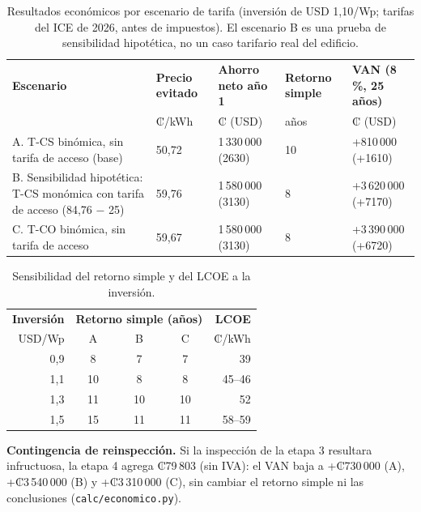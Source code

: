 \documentclass[12pt]{article}
\begin{document}
\begin{table}[H]
\centering\small
\caption{Resultados económicos por escenario de tarifa (inversión de USD 1,10/Wp; tarifas del ICE de 2026, antes de impuestos). El escenario B es una prueba de sensibilidad hipotética, no un caso tarifario real del edificio.}\label{tab:econ}
\begin{tabularx}{\textwidth}{YL{1.6cm}L{2.7cm}L{1.55cm}L{3.2cm}}
\toprule
\textbf{Escenario} & \textbf{Precio evitado} & \textbf{Ahorro neto año 1} & \textbf{Retorno simple} & \textbf{VAN (8\,\%, 25 años)}\\
 & ₡/kWh & ₡ (USD) & años & ₡ (USD)\\
\midrule
A. T-CS binómica, sin tarifa de acceso (base) & 50,72 & 1\,330\,000 (2630) & 10 & +810\,000 (+1610)\\
B. Sensibilidad hipotética: T-CS monómica con tarifa de acceso (84,76 $-$ 25) & 59,76 & 1\,580\,000 (3130) & 8 & +3\,620\,000 (+7170)\\
C. T-CO binómica, sin tarifa de acceso & 59,67 & 1\,580\,000 (3130) & 8 & +3\,390\,000 (+6720)\\
\bottomrule
\end{tabularx}
\end{table}

\begin{table}[H]
\centering\small
\caption{Sensibilidad del retorno simple y del LCOE a la inversión.}\label{tab:sensib}
\begin{tabular}{rcccr}
\toprule
\textbf{Inversión} & \multicolumn{3}{c}{\textbf{Retorno simple (años)}} & \textbf{LCOE}\\
\cmidrule(lr){2-4}
USD/Wp & A & B & C & ₡/kWh\\
\midrule
0,9 & 8 & 7 & 7 & 39\\
1,1 & 10 & 8 & 8 & 45--46\\
1,3 & 11 & 10 & 10 & 52\\
1,5 & 15 & 11 & 11 & 58--59\\
\bottomrule
\end{tabular}
\end{table}

\textbf{Contingencia de reinspección.} Si la inspección de la etapa 3 resultara infructuosa, la etapa 4 agrega ₡79\,803 (sin IVA): el VAN baja a +₡730\,000 (A), +₡3\,540\,000 (B) y +₡3\,310\,000 (C), sin cambiar el retorno simple ni las conclusiones (\texttt{calc/economico.py}).
\end{document}
